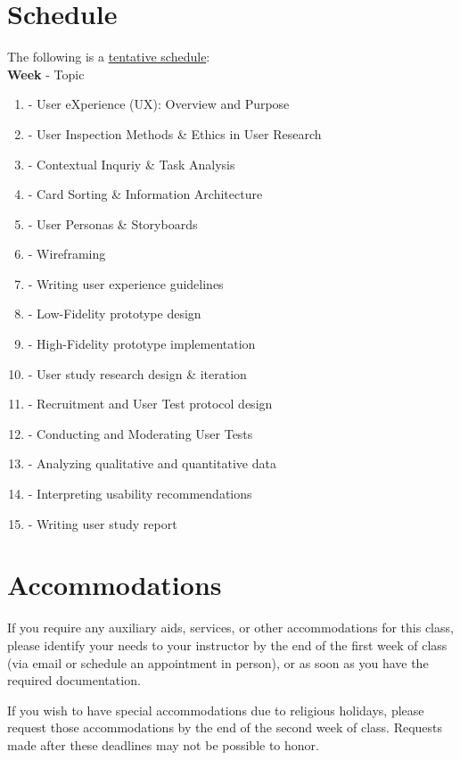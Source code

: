 \documentclass[12pt]{article}
\begin{document}
  \section*{Schedule}
  \noindent
  The following is a \underline{tentative schedule}:\\
  \textbf{Week} - Topic 
  \begin{enumerate}
    \item - User eXperience (UX): Overview and Purpose
    \item - User Inspection Methods \& Ethics in User Research
    \item - Contextual Inquriy \& Task Analysis
    \item - Card Sorting \& Information Architecture
    \item - User Personas \& Storyboards
    \item - Wireframing
    \item - Writing user experience guidelines
    \item - Low-Fidelity prototype design
    \item - High-Fidelity prototype implementation
    \item - User study research design \& iteration
    \item - Recruitment and User Test protocol design
    \item - Conducting and Moderating User Tests
    \item - Analyzing qualitative and quantitative data
    \item - Interpreting usability recommendations
    \item - Writing user study report
  \end{enumerate}

  \section*{Accommodations}
  \noindent
  If you require any auxiliary aids, services, or other accommodations for this class, please identify your needs to your instructor by the end of the first week of class (via email or schedule an appointment in person), or as soon as you have the required documentation.
  \par
  If you wish to have special accommodations due to religious holidays, please request those accommodations by the end of the second week of class. Requests made after these deadlines may not be possible to honor. 
\end{document}
